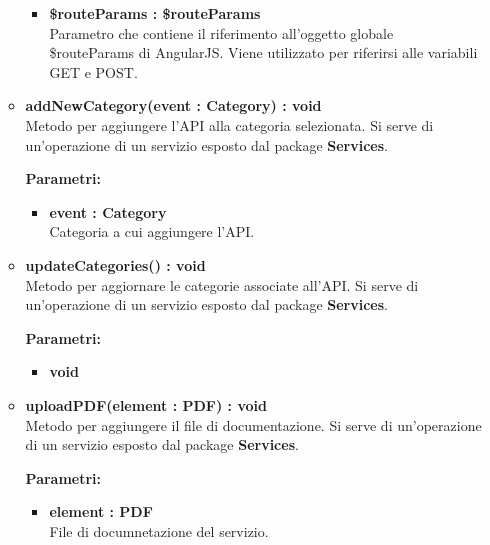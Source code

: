 \begin{itemize}
\begin{itemize}
\begin{itemize}
			\item \textbf{\$routeParams : \$routeParams}\\
			Parametro che contiene il riferimento all'oggetto globale \$routeParams di AngularJS. Viene utilizzato per riferirsi alle variabili GET e POST.
		\end{itemize}
		
		\item \textbf{addNewCategory(event : Category) : void}\\
		Metodo per aggiungere l'API alla categoria selezionata. Si serve di un'operazione di un servizio esposto dal package \textbf{Services}.
		\begin{description}
			\item[\textbf{Parametri:}]
		\end{description}
		\begin{itemize}
			\item \textbf{event : Category}\\
			Categoria a cui aggiungere l'API.
		\end{itemize}
		
		\item \textbf{updateCategories() : void}\\
		Metodo per aggiornare le categorie associate all'API. Si serve di un'operazione di un servizio esposto dal package \textbf{Services}.
		\begin{description}
			\item[\textbf{Parametri:}]
		\end{description}
		\begin{itemize}
			\item \textbf{void}\\
		\end{itemize}
		
		\item \textbf{uploadPDF(element : PDF) : void}\\
		Metodo per aggiungere il file di documentazione. Si serve di un'operazione di un servizio esposto dal package \textbf{Services}.
		\begin{description}
			\item[\textbf{Parametri:}]
		\end{description}
		\begin{itemize}
			\item \textbf{element : PDF}\\
			File di documnetazione del servizio.
		\end{itemize}
		

\end{itemize}
\end{itemize}
